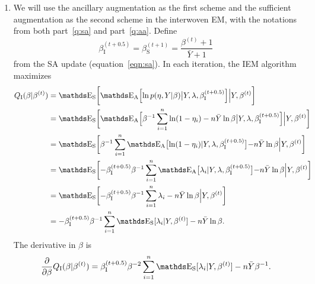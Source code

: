 \begin{enumerate}
\begin{enumerate}
    \item
    We will use the ancillary augmentation as the first scheme and the
    sufficient augmentation as the second scheme in the interwoven EM,
    with the notations from both part~\ref{q:sa} and part~\ref{q:aa}.
    Define
        \[
        \beta_\mathrm{I}^{(t+0.5)}
        =
        \beta_\mathrm{S}^{(t+1)}
        =
        \frac{\beta^{(t)} + 1}{\bar{Y} + 1}
        \]
    from the SA update (equation~\ref{eqn:sa}).
    In each iteration, the IEM algorithm maximizes
        \begin{align*}
        Q_\mathrm{I}(\beta \vert \beta^{(t)})
        &=
        \E_\mathrm{S} \biggl[
        \E_\mathrm{A} \Bigl[
        \ln p(\eta, Y \vert \beta) 
        \big\vert Y, \lambda, \beta_\mathrm{I}^{(t+0.5)} \Bigl] 
        \Big\vert Y, \beta^{(t)} \biggr]
        \\ &=
        \E_\mathrm{S} \biggl[
        \E_\mathrm{A} \Bigl[
        \beta^{-1}\sum_{i=1}^n \ln(1 - \eta_i) - n\bar{Y}\ln\beta
        \big\vert Y, \lambda, \beta_\mathrm{I}^{(t+0.5)} \Bigl] 
        \Big\vert Y, \beta^{(t)} \biggr]
        \\ &=
        \E_\mathrm{S} \biggl[
            \beta^{-1}\sum_{i=1}^n 
            \E_\mathrm{A} \bigl[
                \ln(1 - \eta_i) 
            \vert Y, \lambda, \beta_\mathrm{I}^{(t+0.5)} \bigl]
            - n\bar{Y}\ln\beta
        \Big\vert Y, \beta^{(t)} \biggr]
        \\ &=
        \E_\mathrm{S} \biggl[
            -\beta_\mathrm{I}^{(t+0.5)} \beta^{-1}\sum_{i=1}^n 
            \E_\mathrm{A} \bigl[
                \lambda_i
            \vert Y, \lambda, \beta_\mathrm{I}^{(t+0.5)} \bigl]
            - n\bar{Y}\ln\beta
        \Big\vert Y, \beta^{(t)} \biggr]
        \\ &=
        \E_\mathrm{S} \biggl[
            -\beta_\mathrm{I}^{(t+0.5)} \beta^{-1}\sum_{i=1}^n 
            \lambda_i
            - n\bar{Y}\ln\beta
        \Big\vert Y, \beta^{(t)} \biggr]
        \\ &=
        -\beta_\mathrm{I}^{(t+0.5)} \beta^{-1}\sum_{i=1}^n 
        \E_\mathrm{S} [
            \lambda_i
        \vert Y, \beta^{(t)} ]
        - n\bar{Y}\ln\beta.
        \end{align*}
    The derivative in $\beta$ is
        \[
        \pd{\beta} Q_\mathrm{I}(\beta \vert \beta^{(t)})
        =
        \beta_\mathrm{I}^{(t+0.5)} \beta^{-2}\sum_{i=1}^n 
        \E_\mathrm{S} [
            \lambda_i
        \vert Y, \beta^{(t)} ]
        - n\bar{Y}\beta^{-1}.
        \]

\end{enumerate}
\end{enumerate}
